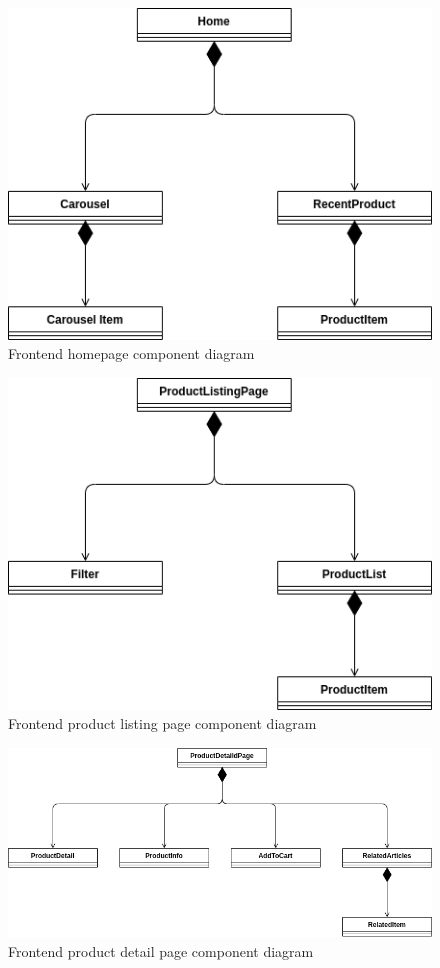 \begin{figure}[!ht]
  \caption{ Frontend homepage component diagram}
  \vspace{10px}
  \includegraphics[scale=0.39]{../../../../Images/Diagrammi/maintainerManual/FE/HomeDiagram.png}
  \centering
\end{figure}
\begin{figure}[!ht]
  \caption{ Frontend product listing page component diagram}
  \vspace{10px}
  \includegraphics[scale=0.39]{../../../../Images/Diagrammi/maintainerManual/FE/PLPDiagram.png}
  \centering
\end{figure}
\begin{figure}[!ht]
  \caption{ Frontend product detail page component diagram}
  \vspace{10px}
  \includegraphics[scale=0.39]{../../../../Images/Diagrammi/maintainerManual/FE/PDPDiagram.png}
  \centering
\end{figure}
